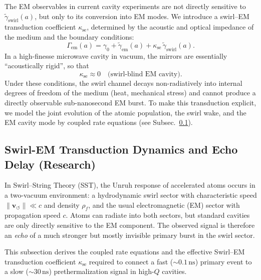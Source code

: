 \documentclass[10pt,reprint,aps,onecolumn,nofootinbib]{revtex4-2}
\newcommand{\vswirl}{\mathbf{v}_{\!\boldsymbol{\circlearrowleft}}}
\newcommand{\rhoF}{\rho_{\!f}}
\begin{document}
The EM observables in current cavity experiments \cite{Deswal2025,Zheng2025,Saha2025}
are not directly sensitive to $\tilde\gamma_{\text{swirl}}(a)$, but only to
its conversion into EM modes. We introduce a swirl--EM transduction
coefficient $\kappa_{\text{se}}$, determined by the acoustic and optical
impedance of the medium and the boundary conditions:
\begin{equation}
    \Gamma_{\text{em}}(a)
    = \gamma_0
    + \tilde\gamma_{\text{em}}(a)
    + \kappa_{\text{se}}\,\tilde\gamma_{\text{swirl}}(a).
    \label{eq:gamma_em_effective}
\end{equation}
In a high-finesse microwave cavity in vacuum, the mirrors are essentially
``acoustically rigid'', so that
\begin{equation}
    \kappa_{\text{se}} \approx 0
    \quad\text{(swirl-blind EM cavity)}.
\end{equation}
Under these conditions, the swirl channel decays non-radiatively into
internal degrees of freedom of the medium (heat, mechanical stress) and
cannot produce a directly observable sub-nanosecond EM burst.
To make this transduction explicit, we model the joint evolution of the atomic population, the swirl wake, and the EM cavity mode by coupled rate equations (see Subsec.~\ref{subsec:swirl_em_transduction_dynamics}).


\subsection{Swirl-EM Transduction Dynamics and Echo Delay (Research)}
    \label{subsec:swirl_em_transduction_dynamics}

    In Swirl--String Theory (SST), the Unruh response of accelerated atoms occurs in a
    two-vacuum environment: a hydrodynamic swirl sector with characteristic speed
    $\lVert\vswirl\rVert \ll c$ and density $\rhoF$, and the usual electromagnetic
    (EM) sector with propagation speed $c$.\cite{Unruh1976,Crispino2008,Barcelo2011}
    Atoms can radiate into both sectors, but standard cavities are only directly
    sensitive to the EM component. The observed signal is therefore an
    \emph{echo} of a much stronger but mostly invisible primary burst in the swirl
    sector.

    This subsection derives the coupled rate equations and the effective
    Swirl--EM transduction coefficient $\kappa_{\text{se}}$ required to connect a fast
    ($\sim 0.1\,\mathrm{ns}$) primary event to a slow ($\sim 30\,\mathrm{ns}$)
    prethermalization signal in high-$Q$ cavities.
\end{document}
